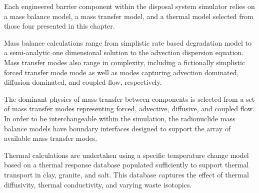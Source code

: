 Each engineered barrier component within the \Cyder disposal system simulator 
relies on a mass balance model, a mass transfer model, and a thermal model 
selected from those four presented in this chapter. 

Mass balance calculations range from simplistic rate based degradation model to 
a semi-analytic one dimensional solution to the advection dispersion equation.  
Mass transfer modes also range in complexity, including a fictionally 
simplistic forced transfer mode mode as well as modes capturing advection 
dominated, diffusion dominated, and coupled flow, respectively.

The dominant physics of mass transfer between components is 
selected from a set of mass transfer modes representing forced, advective, 
diffusive, and coupled flow.  In order to be interchangeable within the 
simulation, the radionuclide mass balance models have boundary interfaces 
designed to support the array of available mass transfer modes. 

Thermal calculations are undertaken using a specific temperature change model 
based on a thermal response database populated sufficiently to support thermal 
transport in clay, granite, and salt. This database captures the effect of 
thermal diffusivity, thermal conductivity, and varying waste isotopics.
